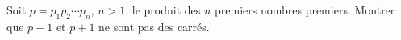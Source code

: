Soit $p = p_1p_2\cdots p_n$, $n > 1$, le produit des $n$ premiers nombres premiers. Montrer que $p - 1$ et $p + 1$ ne sont pas des carrés.
